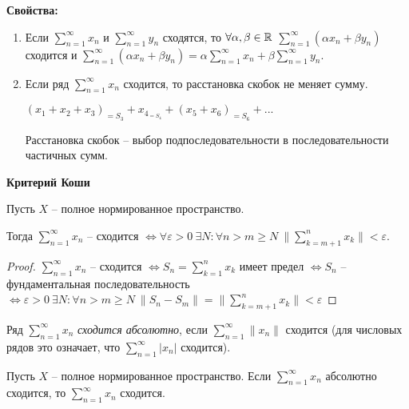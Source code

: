 \begin{statement}
    \textbf{Свойства:}
    \begin{enumerate}
        \item Если $\sum\limits_{n=1}^\infty x_n$ и $\sum\limits_{n=1}^\infty y_n$ сходятся, то $\forall \alpha, \beta\in \mathbb{R}$ $\sum\limits_{n=1}^\infty (\alpha x_n+\beta y_n)$ сходится и $\sum\limits_{n=1}^\infty (\alpha x_n+\beta y_n)=\alpha \sum\limits_{n=1}^\infty x_n+\beta \sum\limits_{n=1}^\infty y_n$.
        
        \item Если ряд $\sum\limits_{n=1}^\infty x_n$ сходится, то расстановка скобок не меняет сумму.

        $(x_1+x_2+x_3)_{=S_3}+x_{4_{=S_4}}+(x_5+x_6)_{=S_6}+...$

        \begin{remark}
            Расстановка скобок – выбор подпоследовательности в последовательности частичных сумм.
        \end{remark}
    \end{enumerate}
\end{statement}

\begin{theorem}
    \textbf{Критерий Коши}

    Пусть $X$ – полное нормированное пространство. 
    
    Тогда $\sum\limits_{n=1}^\infty x_n$ – сходится $\Leftrightarrow \forall \varepsilon >0\ \exists N: \forall n>m\geq N\ \|\sum\limits_{k=m+1}^n x_k\|<\varepsilon$. 
\end{theorem}

\begin{proof}
    $\sum\limits_{n=1}^\infty x_n$ – сходится $\Leftrightarrow S_n=\sum\limits_{k=1}^n x_k$ имеет предел $\Leftrightarrow S_n$ – фундаментальная последовательность $\Leftrightarrow \varepsilon >0\ \exists N: \forall n>m\geq N\ \|S_n-S_m\|=\|\sum\limits_{k=m+1}^n x_k\|<\varepsilon $ 
\end{proof}

\begin{definition}
    Ряд $\sum\limits_{n=1}^\infty x_n$ \textit{сходится абсолютно}, если $\sum\limits_{n=1}^\infty \|x_n\|$ сходится (для числовых рядов это означает, что $\sum\limits_{n=1}^\infty |x_n|$ сходится).
\end{definition}

\begin{theorem}
    Пусть $X$ – полное нормированное пространство. Если $\sum\limits_{n=1}^\infty x_n$ абсолютно сходится, то $\sum\limits_{n=1}^\infty x_n$ сходится.
\end{theorem}

